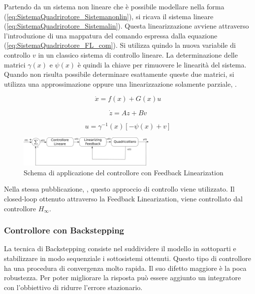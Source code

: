 Partendo da un sistema non lineare che è possibile modellare nella forma (\ref{eq:SistemaQuadrirotore_Sistemanonlin}), si ricava il sistema lineare (\ref{eq:SistemaQuadrirotore_Sistemalin}). Questa linearizzazione avviene attraverso l'introduzione di una mappatura del comando espressa dalla equazione (\ref{eq:SistemaQuadrirotore_FL_com}). Si utilizza quindo la nuova variabile di controllo $v$ in un classico sistema di controllo lineare. La determinazione delle matrici $\gamma(x)$ e $\psi(x)$ è quindi la chiave per rimuovere le linearità del sistema. Quando non risulta possibile determinare esattamente queste due matrici, si utilizza una approssimazione oppure una linearizzazione solamente parziale, \cite{IsidoriA2003NCS}.

\begin{equation}\label{eq:SistemaQuadrirotore_Sistemanonlin}
	\dot{x} = f(x) + G(x) u
\end{equation}

\begin{equation}\label{eq:SistemaQuadrirotore_Sistemalin}
	\dot{z} = A z + B v
\end{equation}

\begin{equation}\label{eq:SistemaQuadrirotore_FL_com}
	u = \gamma^{-1}(x) \left[- \psi(x)+v\right]
\end{equation}

\begin{figure}
	\centering
	\includegraphics[width=0.6\textwidth]{SistemaQuadrirotore/Figure/FLP}
	\caption{Schema di applicazione del controllore con Feedback Linearization}
\end{figure}

Nella stessa pubblicazione, \cite{G_inf}, questo approccio di controllo viene utilizzato. Il closed-loop ottenuto attraverso la Feedback Linearization, viene controllato dal controllore $H_\infty$.

\subsubsection{Controllore con Backstepping}
La tecnica di Backstepping consiste nel suddividere il modello in sottoparti e stabilizzare in modo sequenziale i sottosistemi ottenuti. 
Questo tipo di controllore ha una procedura di convergenza molto rapida. Il suo difetto maggiore è la poca robustezza. Per poter migliorare la risposta può essere aggiunto un integratore con l'obbiettivo di ridurre l'errore stazionario.





